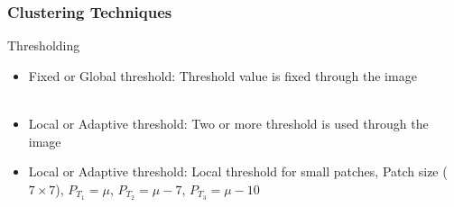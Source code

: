 \documentclass{beamer}
\begin{document}
\begin{frame}
\frametitle{Clustering Techniques}
\begin{block}{Thresholding}
\scriptsize{
\begin{itemize}
\item Fixed or Global threshold: Threshold value is fixed through the image \\
\\
\item Local or Adaptive threshold: Two or more threshold is used through the image\\
\item Local or Adaptive threshold: Local threshold for small patches, Patch size ($7 \times 7$), $P_{T_{1}} = \mu$, $P_{T_{2}} = \mu -7$, $P_{T_{3}} = \mu-10$
\end{itemize}

}
\end{block}
\end{frame}
\end{document}
